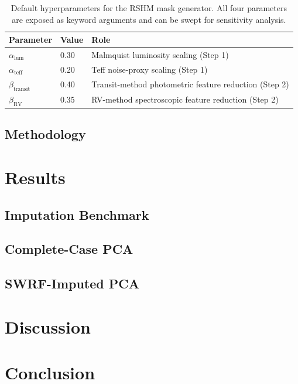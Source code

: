 \documentclass[preprint,longauthor,twocolumn]{aastex631}
\begin{document}
\begin{table}[h]
  \centering
  \begin{tabular}{lll}
    \hline
    \textbf{Parameter} & \textbf{Value} & \textbf{Role} \\
    \hline
    $\alpha_{\mathrm{lum}}$    & 0.30 & Malmquist luminosity scaling (Step 1) \\
    $\alpha_{\mathrm{teff}}$   & 0.20 & Teff noise-proxy scaling (Step 1) \\
    $\beta_{\mathrm{transit}}$ & 0.40 & Transit-method photometric feature reduction (Step 2) \\
    $\beta_{\mathrm{RV}}$      & 0.35 & RV-method spectroscopic feature reduction (Step 2) \\
    \hline
  \end{tabular}
  \caption{Default hyperparameters for the RSHM mask generator. All four parameters are exposed as keyword arguments and can be swept for sensitivity analysis.}
  \label{tab:rshm-params}
\end{table}

\subsection{Methodology}

\section{Results}

\subsection{Imputation Benchmark}

\subsection{Complete-Case PCA}

\subsection{SWRF-Imputed PCA}

\section{Discussion}

\section{Conclusion}


\end{document}

